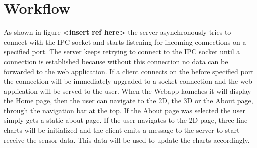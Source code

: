 \section{Workflow}

As shown in figure \textbf{<insert ref here>} the server asynchronously tries to connect with the IPC socket and starts listening for incoming connections on a specified port. The server keeps retrying to connect to the IPC socket until a connection is established because without this connection no data can be forwarded to the web application. If a client connects on the before specified port the connection will be immediately upgraded to a socket connection and the web application will be served to the user. When the Webapp launches it will display the Home page, then the user can navigate to the 2D, the 3D or the About page, through the navigation bar at the top. If the About page was selected the user simply gets a static about page. If the user navigates to the 2D page, three line charts will be initialized and the client emits a message to the server to start receive the sensor data. This data will be used to update the charts accordingly.

